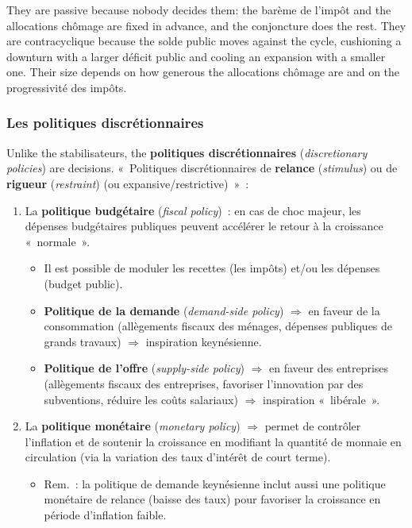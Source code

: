 They are passive because nobody decides them: the barème de l'impôt and the
allocations chômage are fixed in advance, and the conjoncture does the rest.
They are contracyclique because the solde public moves against the cycle,
cushioning a downturn with a larger déficit public and cooling an expansion
with a smaller one. Their size depends on how generous the allocations chômage are
and on the progressivité des impôts.

\subsubsection{Les politiques discrétionnaires}

Unlike the stabilisateurs, the \textbf{politiques discrétionnaires}
(\textit{discretionary policies}) are decisions. «~Politiques discrétionnaires de
\textbf{relance} (\textit{stimulus}) ou de \textbf{rigueur} (\textit{restraint})
(ou expansive/restrictive)~»~:
\begin{enumerate}
  \item La \textbf{politique budgétaire} (\textit{fiscal policy})~: en cas de choc
    majeur, les dépenses budgétaires publiques peuvent accélérer le retour à la
    croissance «~normale~».
    \begin{itemize}
      \item Il est possible de moduler les recettes (les impôts) et/ou les
        dépenses (budget public).
      \item \textbf{Politique de la demande} (\textit{demand-side policy})
        $\Rightarrow$ en faveur de la consommation (allègements fiscaux des
        ménages, dépenses publiques de grands travaux) $\Rightarrow$ inspiration
        keynésienne.
      \item \textbf{Politique de l'offre} (\textit{supply-side policy})
        $\Rightarrow$ en faveur des entreprises (allègements fiscaux des
        entreprises, favoriser l'innovation par des subventions, réduire les coûts
        salariaux) $\Rightarrow$ inspiration «~libérale~».
    \end{itemize}
  \item La \textbf{politique monétaire} (\textit{monetary policy})
    $\Rightarrow$ permet de contrôler l'inflation et de soutenir la croissance en
    modifiant la quantité de monnaie en circulation (via la variation des taux
    d'intérêt de court terme).
    \begin{itemize}
      \item Rem.~: la politique de demande keynésienne inclut aussi une politique
        monétaire de relance (baisse des taux) pour favoriser la croissance en
        période d'inflation faible.
    \end{itemize}
\end{enumerate}

